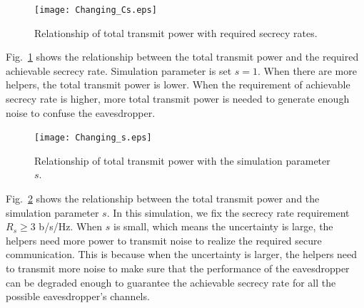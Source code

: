 \documentclass[12pt,journal,draftclsnofoot,onecolumn]{IEEEtran}
\begin{document}
\begin{figure}[!ht]
	\centering
	\texttt{[image: Changing\_Cs.eps]} %
	\caption{Relationship of total transmit power with required secrecy rates.}
	\label{fig:Changing_Cs}
\end{figure}

Fig.~\ref{fig:Changing_Cs} shows the relationship between the total transmit power and the required achievable secrecy rate. Simulation parameter is set $s = 1$. When there are more helpers, the total transmit power is lower. 
When the requirement of achievable secrecy rate is higher, more total transmit power is needed to generate enough noise to confuse the eavesdropper. %

\begin{figure}[!ht]
	\centering
	\texttt{[image: Changing\_s.eps]} %
	\caption{Relationship of total transmit power with the simulation parameter $s$.}
	\label{fig:Changing_s}
\end{figure}

Fig.~\ref{fig:Changing_s} shows  the relationship between the total transmit power and the simulation parameter $s$. In this simulation, we fix the secrecy rate requirement $R_s \geq 3 $ b/s/Hz. When $s$ is small, which means the uncertainty is large, the helpers need more power to transmit noise to realize the required secure communication. This is because when the uncertainty is larger, the helpers need to transmit more noise to make sure that the performance of the eavesdropper can be degraded enough to guarantee the achievable secrecy rate for all the possible eavesdropper's channels.
\end{document}
